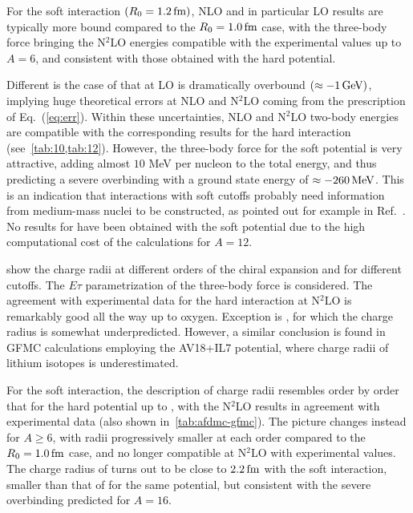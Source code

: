 \documentclass[aps,prc,twocolumn,superscriptaddress,floatfix]{revtex4-1}
\begin{document}
For the soft interaction $(R_0=1.2\,\rm fm)$, NLO and in particular LO results are 
typically more bound compared to the $R_0=1.0\,\rm fm$ case, with the three-body 
force bringing the N$^2$LO energies compatible with the experimental values up to $A=6$,
and consistent with those obtained with the hard potential. 

Different is the case of  that at LO is dramatically overbound
$(\approx -1\,\rm GeV)$, implying huge theoretical errors at NLO and N$^2$LO coming from 
the prescription of Eq.~(\ref{eq:err}). Within these uncertainties, NLO and N$^2$LO two-body energies 
are compatible with the corresponding results for the hard interaction (see~\cref{tab:10,tab:12}).
However, the three-body force for the soft potential is very attractive,
adding almost $10$ MeV per nucleon to the total energy, and thus
predicting a severe overbinding with a ground state energy of $\approx -260\,\rm MeV$.
This is an indication that interactions with soft cutoffs probably need information from 
medium-mass nuclei to be constructed, as pointed out for example in Ref.~\cite{Ekstrom:2015}.
No results for  have been obtained with the soft potential due to the high 
computational cost of the calculations for $A=12$. 

 show the charge radii at different orders of the chiral 
expansion and for different cutoffs. The $E\tau$ parametrization of the three-body force
is considered.
The agreement with experimental data for the hard interaction at N$^2$LO is remarkably
good all the way up to oxygen. Exception is , for which the charge radius
is somewhat underpredicted. However, a similar conclusion is found in GFMC calculations
employing the AV18+IL7 potential, where charge radii of lithium isotopes is underestimated. 

For the soft interaction, the description of charge radii resembles order by order 
that for the hard potential up to , with the N$^2$LO results in agreement 
with experimental data (also shown in~\cref{tab:afdmc-gfmc}). 
The picture changes instead for $A\ge6$, with radii progressively smaller at each order
compared to the $R_0=1.0\,\rm fm$ case, and no longer compatible at N$^2$LO with experimental 
values. The charge radius of  turns out to be close to $2.2\,\rm fm$ with the 
soft interaction, smaller than that of  for the same potential, 
but consistent with the severe overbinding predicted for $A=16$.
\end{document}
